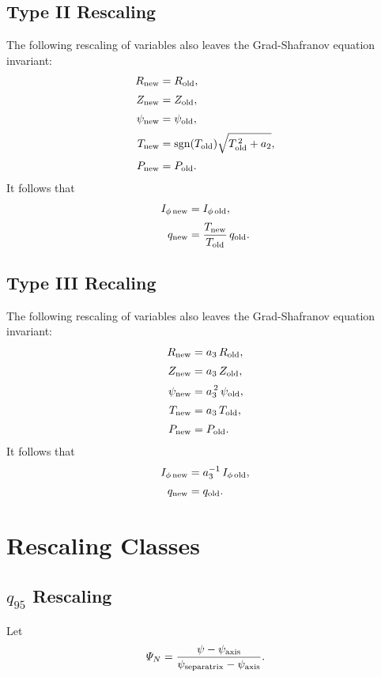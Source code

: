 \documentclass[12pt]{article}
\begin{document}
\subsection{Type II Rescaling}
The following rescaling of variables also leaves the Grad-Shafranov equation invariant:
\begin{align}
R_{\rm new}&=R_{\rm old},\\[0.5ex]
Z_{\rm new}&=Z_{\rm old},\\[0.5ex]
\psi_{\rm new} &=\psi_{\rm old},\\[0.5ex]
T_{\rm new} &={\rm sgn}(T_{\rm old})\sqrt{T_{\rm old}^{\,2}+a_2},\\[0.5ex]
P_{\rm new} &=P_{\rm old}.
\end{align}
It follows that
\begin{align}
I_{\phi\,{\rm new}} &=I_{\phi\,{\rm old}},\\[0.5ex]
q_{\rm new} &=\frac{T_{\rm new}}{T_{\rm old}}\, q_{\rm old}.
\end{align} 

\subsection{Type III Recaling}
The following rescaling of variables also leaves the Grad-Shafranov equation invariant:
\begin{align}
R_{\rm new}&=a_3\,R_{\rm old},\\[0.5ex]
Z_{\rm new}&=a_3\,Z_{\rm old},\\[0.5ex]
\psi_{\rm new} &=a_3^{\,2}\,\psi_{\rm old},\\[0.5ex]
T_{\rm new} &=a_3\,T_{\rm old},\\[0.5ex]
P_{\rm new} &=P_{\rm old}.
\end{align}
It follows that
\begin{align}
I_{\phi\,{\rm new}} &=a_3^{-1}\,I_{\phi\,{\rm old}},\\[0.5ex]
q_{\rm new} &= q_{\rm old}.
\end{align} 

\section{Rescaling Classes}
\subsection{$q_{95}$ Rescaling}
Let
\begin{equation}
{\mit\Psi}_N = \frac{\psi - \psi_{\rm axis}}{\psi_{\rm separatrix}-\psi_{\rm axis}}.
\end{equation}
\end{document}
